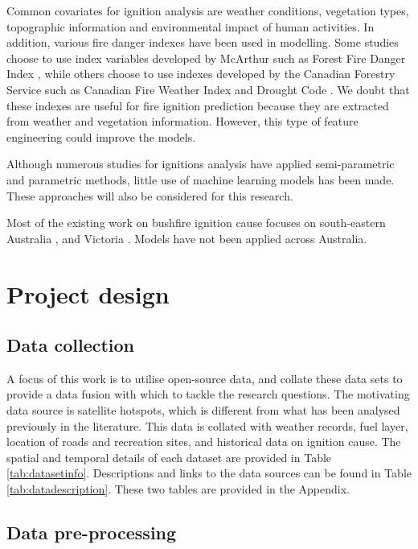 \documentclass[11pt,a4paper,]{article}
\begin{document}
Common covariates for ignition analysis are weather conditions, vegetation types, topographic information and environmental impact of human activities. In addition, various fire danger indexes have been used in modelling. Some studies choose to use index variables developed by McArthur such as Forest Fire Danger Index \autocite{clarke2019developing,read2018lightning}, while others choose to use indexes developed by the Canadian Forestry Service such as Canadian Fire Weather Index and Drought Code \autocite{plucinski2014predicting}. We doubt that these indexes are useful for fire ignition prediction because they are extracted from weather and vegetation information. However, this type of feature engineering could improve the models.

Although numerous studies for ignitions analysis have applied semi-parametric and parametric methods, little use of machine learning models has been made. These approaches will also be considered for this research.

Most of the existing work on bushfire ignition cause focuses on south-eastern Australia \autocite{clarke2019developing}, and Victoria \autocite{read2018lightning}. Models have not been applied across Australia.

\hypertarget{project-design}{%
\section{Project design}\label{project-design}}

\hypertarget{data-collection}{%
\subsection{Data collection}\label{data-collection}}

A focus of this work is to utilise open-source data, and collate these data sets to provide a data fusion with which to tackle the research questions. The motivating data source is satellite hotspots, which is different from what has been analysed previously in the literature. This data is collated with weather records, fuel layer, location of roads and recreation sites, and historical data on ignition cause. The spatial and temporal details of each dataset are provided in Table \ref{tab:datasetinfo}. Descriptions and links to the data sources can be found in Table \ref{tab:datadescription}. These two tables are provided in the Appendix.

\hypertarget{data-pre-processing}{%
\subsection{Data pre-processing}\label{data-pre-processing}}
\end{document}
